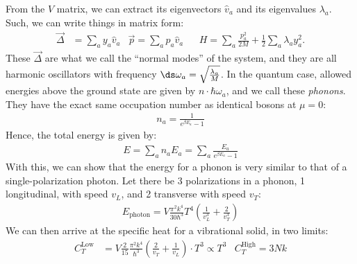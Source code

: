 \documentclass{article}
\begin{document}
From the $V$ matrix, we can extract its eigenvectors $\hat{v}_a$ and its eigenvalues $\lambda_a$. Such, we can write things in matrix form:
\begin{align*}
  \vec{\Delta} &= \sum_{a} y_a \hat{v}_a & \vec{p} = \sum_a p_a \hat{v}_a && H = \sum_a \frac{p_a^2}{2M} + \frac{1}{2} \sum_a \lambda_a y_a^2.
\end{align*}
These $\vec{\Delta}$ are what we call the ``normal modes'' of the system, and they are all harmonic oscillators with frequency $\ds \omega_a = \sqrt{\frac{\lambda_a}{M}}$. In the quantum case, allowed energies above the ground state are given by $n \cdot \hbar \omega_a$, and we call these \textit{phonons}. They have the exact same occupation number as identical bosons at $\mu = 0$:
\begin{align*}
  n_a = \frac{1}{e^{\beta E_a} - 1}
\end{align*}
Hence, the total energy is given by:
\begin{align*}
  E = \sum_{a} n_a E_a = \sum_{a} \frac{E_a}{e^{\beta E_a} - 1}
\end{align*}
With this, we can show that the energy for a phonon is very similar to that of a single-polarization photon. Let there be 3 polarizations in a phonon, 1 longitudinal, with speed $v_L$, and 2 transverse with speed $v_T$:
\begin{align*}
  E_\text{photon} = V \frac{\pi^2 k^4}{30\hbar^3} T^4 \left(\frac{1}{v_L^3} + \frac{2}{v_T^3}\right)
\end{align*}
We can then arrive at the specific heat for a vibrational solid, in two limits:
\begin{align*}
  C_{T}^\text{Low} &= V \frac{2}{15} \frac{\pi^2 k^4}{\hbar^3} \left(\frac{2}{v_T} + \frac{1}{v_L}\right) \cdot T^3 \propto T^3 & 
  C_T^\text{High} = 3Nk
\end{align*}

\vfill\pagebreak
\end{document}
